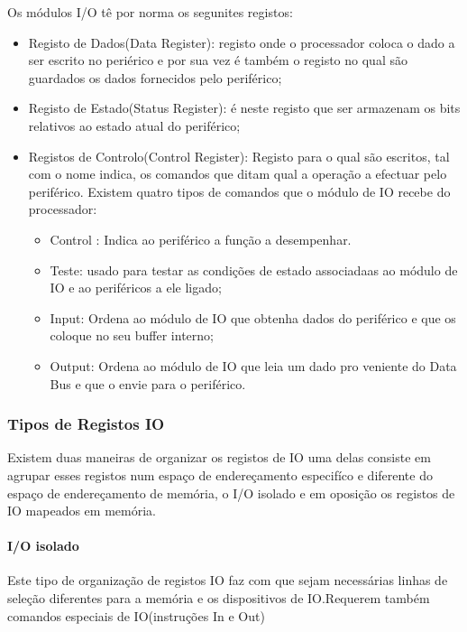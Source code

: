 \documentclass[10pt,a4paper]{paper}
\begin{document}
	\begin{flushleft}
	Os módulos I/O tê por norma os segunites registos:
	\end{flushleft}
		\begin{itemize}
		\item Registo de Dados(Data Register): registo onde o processador coloca o dado a ser escrito no periérico e por sua vez é também o registo no qual são guardados os dados fornecidos pelo periférico;
		\item Registo de Estado(Status Register):  é neste registo que ser armazenam os bits relativos ao estado atual do periférico;
		\item Registos de Controlo(Control Register): Registo para o qual são escritos, tal com o nome indica, os comandos que ditam qual a operação a efectuar pelo periférico. Existem quatro tipos de comandos que o módulo de IO recebe do processador:
		\begin{itemize}
			\item Control : Indica ao periférico a função a desempenhar.
			\item Teste: usado para testar as condições de estado associadaas ao módulo de IO e ao periféricos a ele ligado;
			\item Input: Ordena ao módulo de IO que obtenha dados do periférico e que os coloque no seu buffer interno;
			\item Output: Ordena ao módulo de IO que leia um dado pro veniente do Data Bus e que o envie para o periférico.
		\end{itemize}
	\end{itemize}

	\subsubsection*{Tipos de Registos IO}
	Existem duas maneiras de organizar os registos de IO uma delas consiste em agrupar esses registos num espaço de endereçamento especifíco e diferente do espaço de endereçamento de memória, o I/O isolado e em oposição os registos de IO mapeados em memória.	
		
	\paragraph*{I/O isolado}
	
	Este tipo de organização de registos IO faz com que sejam necessárias linhas de seleção diferentes para a memória e os dispositivos de IO.Requerem também comandos especiais de IO(instruções In e Out)
	
\end{document}
